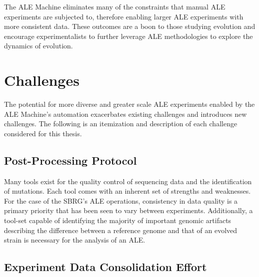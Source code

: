\documentclass[12pt,final,masters,chapterheads]{ucsd}  %
\begin{document}
The ALE Machine eliminates many of the constraints that manual ALE experiments are subjected to, therefore enabling larger ALE experiments with more consistent data. These outcomes are a boon to those studying evolution and encourage experimentalists to further leverage ALE methodologies to explore the dynamics of evolution.


\section{Challenges}
% 
% 

The potential for more diverse and greater scale ALE experiments enabled by the ALE Machine's automation exacerbates existing challenges and introduces new challenges. The following is an itemization and description of each challenge considered for this thesis.

\subsection{Post-Processing Protocol}

Many tools exist for the quality control of sequencing data and the identification of mutations. Each tool comes with an inherent set of strengths and weaknesses. For the case of the SBRG's ALE operations, consistency in data quality is a primary priority that has been seen to vary between experiments. Additionally, a tool-set capable of identifying the majority of important genomic artifacts describing the difference between a reference genome and that of an evolved strain is necessary for the analysis of an ALE.


\subsection{Experiment Data Consolidation Effort}
\end{document}
